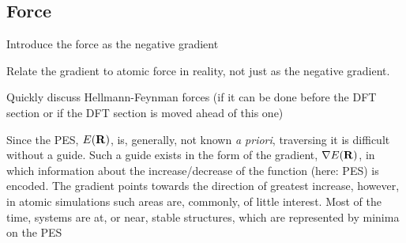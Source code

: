 \subsection{Force}
\label{sec:force}

\bit
\item Introduce the force as the negative gradient
\item Relate the gradient to atomic force in reality, not just as the negative gradient.
\item Quickly discuss Hellmann-Feynman forces (if it can be done before the DFT section or if the DFT section is moved ahead of this one)
\eit

Since the PES, $E({\mathrm{\mathbf{\bm{R}}}})$, is, generally, not known \textit{a priori}, traversing it is difficult without a guide.
Such a guide exists in the form of the gradient, $\nabla E({\mathrm{\mathbf{\bm{R}}}})$, in which information about the increase/decrease of the function (here: PES) is encoded.
The gradient points towards the direction of greatest increase, however, in atomic simulations such areas are, commonly, of little interest.
Most of the time, systems are at, or near, stable structures, which are represented by minima on the PES \expand



